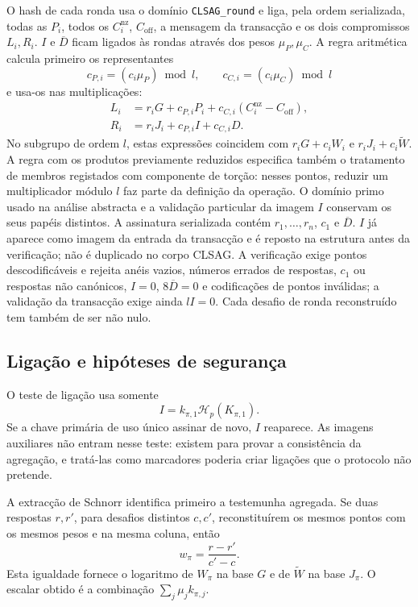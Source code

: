 O hash de cada ronda usa o domínio \texttt{CLSAG\_round} e liga, pela ordem
serializada, todas as \(P_i\), todos os \(C_i^{\mathrm{nz}}\),
\(C_{\mathrm{off}}\), a mensagem da transacção e os dois compromissos
\(L_i,R_i\). \(I\) e \(\overline D\) ficam ligados às rondas através dos pesos
\(\mu_P,\mu_C\). A regra aritmética calcula primeiro os representantes
\[
 c_{P,i}=(c_i\mu_P)\bmod l,\qquad
 c_{C,i}=(c_i\mu_C)\bmod l
\]
e usa-os nas multiplicações:
\begin{align*}
L_i&=r_iG+c_{P,i}P_i+c_{C,i}(C_i^{\mathrm{nz}}-C_{\mathrm{off}}),\\
R_i&=r_iJ_i+c_{P,i}I+c_{C,i}D.
\end{align*}
No subgrupo de ordem \(l\), estas expressões coincidem com
\(r_iG+c_iW_i\) e \(r_iJ_i+c_i\widetilde W\).
A regra com os produtos previamente reduzidos especifica também o
tratamento de membros registados com componente de torção: nesses pontos,
reduzir um multiplicador módulo \(l\) faz parte da definição da operação.
O domínio primo usado na análise abstracta e a validação particular da
imagem \(I\) conservam os seus papéis distintos.
A assinatura serializada contém \(r_1,\ldots,r_n\), \(c_1\) e
\(\overline D\). \(I\) já aparece como imagem da entrada da transacção e é
reposto na estrutura antes da verificação; não é duplicado no corpo CLSAG.
A verificação exige pontos descodificáveis e rejeita anéis vazios, números errados de
respostas, \(c_1\) ou respostas não canónicos, \(I=0\), \(8\overline D=0\) e
codificações de pontos inválidas; a validação da transacção exige ainda
\(lI=0\). Cada desafio de ronda reconstruído tem também de ser não nulo.

\subsection*{Ligação e hipóteses de segurança}

O teste de ligação usa somente
\[
I=k_{\pi,1}\mathcal H_p(K_{\pi,1}).
\]
Se a chave primária de uso único assinar de novo, \(I\) reaparece. As imagens
auxiliares não entram nesse teste: existem para provar a consistência da
agregação, e tratá-las como marcadores poderia criar ligações que o protocolo
não pretende.

A extracção de Schnorr identifica primeiro a testemunha agregada.
Se duas respostas \(r,r'\), para desafios distintos \(c,c'\), reconstituírem
os mesmos pontos com os mesmos pesos e na mesma coluna, então
\[
 w_\pi=\frac{r-r'}{c'-c}.
\]
Esta igualdade fornece o logaritmo de \(W_\pi\) na base \(G\) e de
\(\widetilde W\) na base \(J_\pi\). O escalar obtido é a combinação
\(\sum_j\mu_jk_{\pi,j}\).


